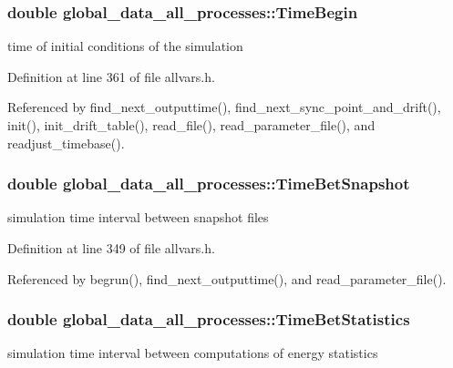 \hypertarget{structglobal__data__all__processes_ad671e0af15abea094631b996dc78c8f1}{
\subsubsection[{TimeBegin}]{\setlength{\rightskip}{0pt plus 5cm}double {\bf global\_\-data\_\-all\_\-processes::TimeBegin}}}
\label{structglobal__data__all__processes_ad671e0af15abea094631b996dc78c8f1}
time of initial conditions of the simulation 

Definition at line 361 of file allvars.h.



Referenced by find\_\-next\_\-outputtime(), find\_\-next\_\-sync\_\-point\_\-and\_\-drift(), init(), init\_\-drift\_\-table(), read\_\-file(), read\_\-parameter\_\-file(), and readjust\_\-timebase().

\hypertarget{structglobal__data__all__processes_a0c02c06bb5214dcf72dd4eb757df8ad3}{
\subsubsection[{TimeBetSnapshot}]{\setlength{\rightskip}{0pt plus 5cm}double {\bf global\_\-data\_\-all\_\-processes::TimeBetSnapshot}}}
\label{structglobal__data__all__processes_a0c02c06bb5214dcf72dd4eb757df8ad3}
simulation time interval between snapshot files 

Definition at line 349 of file allvars.h.



Referenced by begrun(), find\_\-next\_\-outputtime(), and read\_\-parameter\_\-file().

\hypertarget{structglobal__data__all__processes_a516be9ff5c4fd4171aa8e1a687e1e72d}{
\subsubsection[{TimeBetStatistics}]{\setlength{\rightskip}{0pt plus 5cm}double {\bf global\_\-data\_\-all\_\-processes::TimeBetStatistics}}}
\label{structglobal__data__all__processes_a516be9ff5c4fd4171aa8e1a687e1e72d}
simulation time interval between computations of energy statistics 

